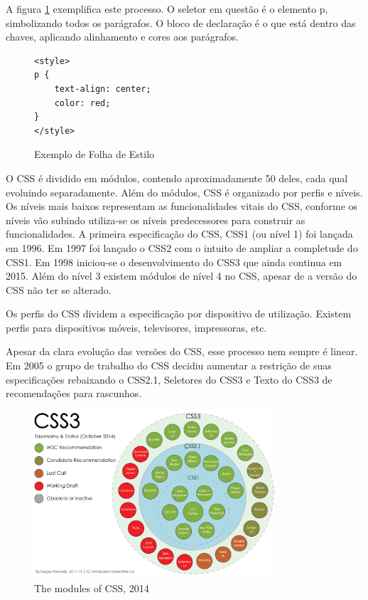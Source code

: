 \documentclass[
12pt,
a4paper,
portuges,
draft
]{report}
\begin{document}
A figura \ref{fig:CSSSample} exemplifica este processo. O seletor em
questão é o elemento p, simbolizando todos os parágrafos. O bloco de declaração
é o que está dentro das chaves, aplicando alinhamento e cores aos parágrafos.

\begin{figure}
\centering
\begin{verbatim}
<style>
p {
    text-align: center;
    color: red;
}
</style>
\end{verbatim}
\caption{Exemplo de Folha de Estilo}
\label{fig:CSSSample}
\end{figure}

O CSS é dividido em módulos, contendo aproximadamente 50 deles, cada
qual evoluindo separadamente. Além do módulos, CSS é organizado por perfis e níveis.
Os níveis mais baixos representam as funcionalidades vitais do CSS, conforme os níveis
vão subindo utiliza-se os níveis predecessores para construir as funcionalidades.
A primeira especificação do CSS, CSS1 (ou nível 1) foi lançada em 1996. Em 1997 foi lançado o
 CSS2 com o intuito de ampliar a completude do CSS1. Em 1998 iniciou-se o desenvolvimento
 do CSS3 que ainda continua em 2015. Além do nível 3 existem módulos de nível 4 no CSS, apesar de a
versão do CSS não ter se alterado.

Os perfis do CSS dividem a especificação por dispositivo de utilização. Existem perfis
para dispositivos móveis, televisores, impressoras, etc.

Apesar da clara evolução das versões do CSS, esse processo nem sempre é linear.
Em 2005 o grupo de trabalho do CSS decidiu aumentar a restrição de suas especificações
rebaixando o CSS2.1, Seletores do CSS3 e Texto do CSS3 de recomendações para rascunhos.

\begin{figure}
    \centering
    \includegraphics[width=0.8\textwidth,natwidth=610,natheight=642]{cssModules.png}
	\caption{The modules of CSS, 2014}
\end{figure}
\end{document}
